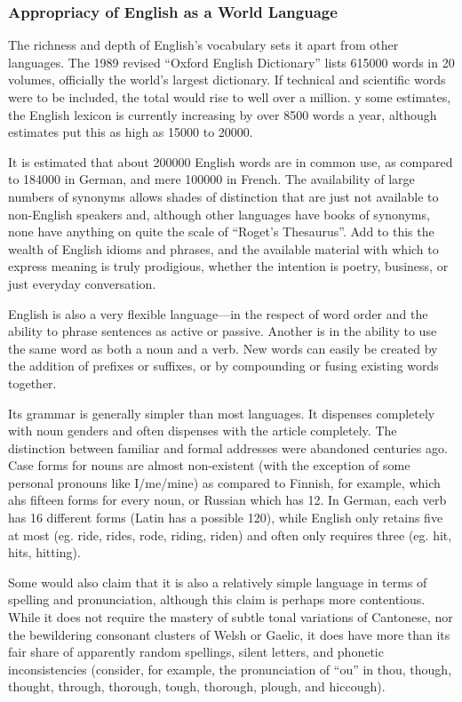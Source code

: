 \documentclass[../main.tex]{subfiles}
\begin{document}
        \subsubsection{Appropriacy of English as a World Language}
        The richness and depth of English's vocabulary sets it apart from other languages. The 1989 revised ``Oxford English Dictionary'' lists \num{615000} words in 20 volumes, officially the world's largest dictionary. If technical and scientific words were to be included, the total would rise to well over a million. y some estimates, the English lexicon is currently increasing by over 8500 words a year, although estimates put this as high as \num{15000} to \num{20000}. \par
        It is estimated that about \num{200000} English words are in common use, as compared to \num{184000} in German, and mere \num{100000} in French. The availability of large numbers of synonyms allows shades of distinction that are just not available to non-English speakers and, although other languages have books of synonyms, none have anything on quite the scale of ``Roget's  Thesaurus''. Add to this the wealth of English idioms and phrases, and the available material with which to express meaning is truly prodigious, whether the intention is poetry, business, or just everyday conversation. \par 
        English is also a very flexible language---in the respect of word order and the ability to phrase sentences as active or passive. Another is in the ability to use the same word as both a noun and a verb. New words can easily be created by the addition of prefixes or suffixes, or by compounding or fusing existing words together. \par
        Its grammar is generally simpler than most languages. It dispenses completely with noun genders and often dispenses with the article completely. The distinction between familiar and formal addresses were abandoned centuries ago. Case forms for nouns are almost non-existent (with the exception of some personal pronouns like I/me/mine) as compared to Finnish, for example, which ahs fifteen forms for every noun, or Russian which has 12. In German, each verb has 16 different forms (Latin has a possible 120), while English only retains five at most (eg. ride, rides, rode, riding, riden) and often only requires three  (eg. hit, hits, hitting). \par
        Some would also claim that it is also a relatively simple language in terms of spelling and pronunciation, although this claim is perhaps more contentious. While it does not require the mastery of subtle tonal variations of Cantonese, nor the bewildering consonant clusters of Welsh or Gaelic, it does have more than its fair share of apparently random spellings, silent letters, and phonetic inconsistencies (consider, for example, the pronunciation of ``ou'' in thou, though, thought, through, thorough, tough, thorough, plough, and hiccough). \par
\end{document}
